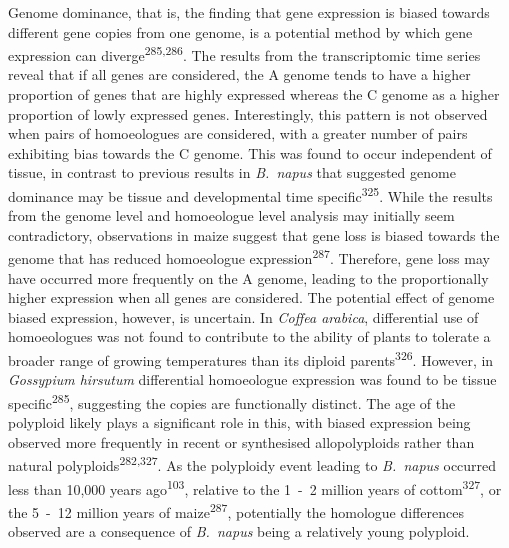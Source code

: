 \documentclass[12pt,]{book}
\begin{document}
Genome dominance, that is, the finding that gene expression is biased
towards different gene copies from one genome, is a potential method by
which gene expression can diverge\textsuperscript{285,286}. The results
from the transcriptomic time series reveal that if all genes are
considered, the A genome tends to have a higher proportion of genes that
are highly expressed whereas the C genome as a higher proportion of
lowly expressed genes. Interestingly, this pattern is not observed when
pairs of homoeologues are considered, with a greater number of pairs
exhibiting bias towards the C genome. This was found to occur
independent of tissue, in contrast to previous results in
\emph{B.~napus} that suggested genome dominance may be tissue and
developmental time specific\textsuperscript{325}. While the results from
the genome level and homoeologue level analysis may initially seem
contradictory, observations in maize suggest that gene loss is biased
towards the genome that has reduced homoeologue
expression\textsuperscript{287}. Therefore, gene loss may have occurred
more frequently on the A genome, leading to the proportionally higher
expression when all genes are considered. The potential effect of genome
biased expression, however, is uncertain. In \emph{Coffea arabica},
differential use of homoeologues was not found to contribute to the
ability of plants to tolerate a broader range of growing temperatures
than its diploid parents\textsuperscript{326}. However, in
\emph{Gossypium hirsutum} differential homoeologue expression was found
to be tissue specific\textsuperscript{285}, suggesting the copies are
functionally distinct. The age of the polyploid likely plays a
significant role in this, with biased expression being observed more
frequently in recent or synthesised allopolyploids rather than natural
polyploids\textsuperscript{282,327}. As the polyploidy event leading to
\emph{B.~napus} occurred less than 10,000 years
ago\textsuperscript{103}, relative to the 1~-~2 million years of
cottom\textsuperscript{327}, or the 5~-~12 million years of
maize\textsuperscript{287}, potentially the homologue differences
observed are a consequence of \emph{B.~napus} being a relatively young
polyploid.
\end{document}
